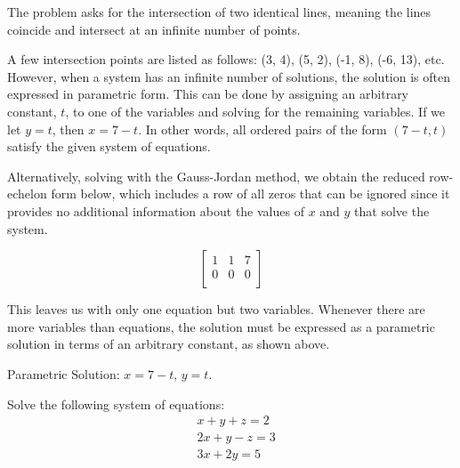\begin{solution}
    The problem asks for the intersection of two identical lines, meaning the lines coincide and intersect at an infinite number of points.

    A few intersection points are listed as follows: (3, 4), (5, 2), (-1, 8), (-6, 13), etc. However, when a system has an infinite number of solutions, the solution is often expressed in parametric form. This can be done by assigning an arbitrary constant, \( t \), to one of the variables and solving for the remaining variables. If we let \( y = t \), then \( x = 7 - t \). In other words, all ordered pairs of the form \( (7 - t, t) \) satisfy the given system of equations.

    Alternatively, solving with the Gauss-Jordan method, we obtain the reduced row-echelon form below, which includes a row of all zeros that can be ignored since it provides no additional information about the values of \( x \) and \( y \) that solve the system.

    \[
        \left[\begin{array}{cc|c}
                1 & 1 & 7 \\
                0 & 0 & 0 \\
            \end{array}\right]
    \]

    This leaves us with only one equation but two variables. Whenever there are more variables than equations, the solution must be expressed as a parametric solution in terms of an arbitrary constant, as shown above.

    Parametric Solution: \( x = 7 - t \), \( y = t \).
\end{solution}


\begin{example}
    Solve the following system of equations:
    \[
        \begin{aligned}
             & x + y + z = 2  \\
             & 2x + y - z = 3 \\
             & 3x + 2y = 5
        \end{aligned}
    \]
\end{example}

